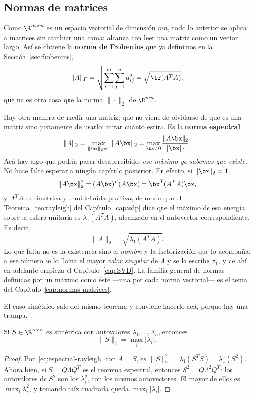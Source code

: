 \subsection{Normas de matrices}

Como $\R^{m\times n}$ es un espacio vectorial de dimensión $mn$, todo lo
anterior se aplica a matrices sin cambiar una coma: alcanza con leer una
matriz como un vector largo. Así se obtiene la \textbf{norma de Frobenius}
que ya definimos en la Sección~\ref{sec:frobenius},
\[
\|A\|_F=\sqrt{\sum_{i=1}^{m}\sum_{j=1}^{n}a_{ij}^2}=\sqrt{\tr(A^TA)},
\]
que no es otra cosa que la norma $\|\cdot\|_2$ de $\R^{mn}$.

Hay otra manera de medir una matriz, que no viene de olvidarse de que es una
matriz sino justamente de usarlo: mirar cuánto estira. Es la \textbf{norma
espectral}
\[
\|A\|_2=\max_{\|\bx\|_2=1}\|A\bx\|_2
=\max_{\bx\neq0}\frac{\|A\bx\|_2}{\|\bx\|_2} .
\]
Acá hay algo que podría pasar desapercibido: \emph{ese máximo ya sabemos que
existe}. No hace falta esperar a ningún capítulo posterior. En efecto, si
$\|\bx\|_2=1$,
\[
\|A\bx\|_2^2=(A\bx)^T(A\bx)=\bx^T(A^TA)\bx ,
\]
y $A^TA$ es simétrica y semidefinida positiva, de modo que el
Teorema~\ref{teo:rayleigh} del Capítulo~\ref{cap:sdp} dice que el máximo de
esa energía sobre la esfera unitaria es $\lambda_1(A^TA)$, alcanzado en el
autovector correspondiente. Es decir,
\begin{equation}\label{eq:espectral-rayleigh}
\|A\|_2=\sqrt{\lambda_1(A^TA)} .
\end{equation}
Lo que falta no es la existencia sino el \emph{nombre} y la factorización que
lo acompaña: a ese número se lo llama el mayor \emph{valor singular} de $A$ y
se lo escribe $\sigma_1$, y de ahí en adelante empieza el
Capítulo~\ref{cap:SVD}. La familia general de normas definidas por un máximo
como éste ---una por cada norma vectorial--- es el tema del
Capítulo~\ref{cap:normas-matrices}.

El caso simétrico sale del mismo teorema y conviene hacerlo acá, porque hay
una trampa.

\begin{proposition}\label{prop:normaS-espectral}
Si $S\in\R^{n\times n}$ es simétrica con autovalores
$\lambda_1,\dots,\lambda_n$, entonces
\[
\|S\|_2=\max_{i}|\lambda_i| .
\]
\end{proposition}

\begin{proof}
Por~\eqref{eq:espectral-rayleigh} con $A=S$, es
$\|S\|_2^2=\lambda_1(S^TS)=\lambda_1(S^2)$. Ahora bien, si $S=Q\Lambda Q^T$
es el teorema espectral, entonces $S^2=Q\Lambda^2Q^T$: los autovalores de
$S^2$ son los $\lambda_i^2$, con los mismos autovectores. El mayor de ellos
es $\max_i\lambda_i^2$, y tomando raíz cuadrada queda $\max_i|\lambda_i|$.
\end{proof}

